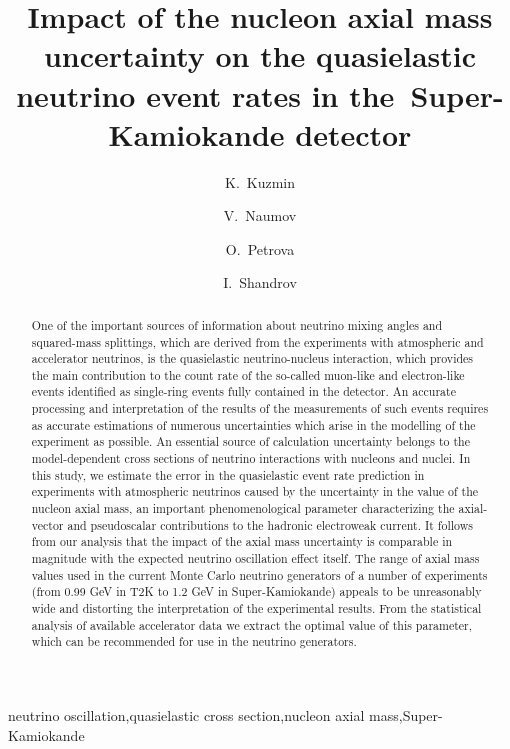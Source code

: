 \documentclass[review]{elsarticle}
\begin{document}
\begin{frontmatter}

\title{Impact of the nucleon axial mass uncertainty on the quasielastic neutrino event rates in the~Super-Kamiokande detector}

\author[ITEP,JINR]{K.~Kuzmin}

\author[JINR]{V.~Naumov}

\author[JINR]{O.~Petrova}

\author[JINR]{I.~Shandrov}

\address[ITEP]{Institute for Theoretical and Experimental Physics, Bolshaya Cheremushkinskaya 25, RU-117218 Moscow, Russia}
\address[JINR]{Joint Institute for Nuclear Research, Joliot-Curie 6, RU-141980 Dubna, Russia}

\begin{abstract}
One of the important sources of information about neutrino mixing angles and squared-mass splittings, which are derived from the experiments with atmospheric and accelerator neutrinos, is the quasielastic neutrino-nucleus interaction, which provides the main contribution to the count rate of the so-called muon-like and electron-like events identified as single-ring events fully contained in the detector. An accurate processing and interpretation of the results of the measurements of such events requires as accurate estimations of numerous uncertainties which arise in the modelling of the experiment as possible. An essential source of calculation uncertainty belongs to the model-dependent cross sections of neutrino interactions with nucleons and nuclei. In this study, we estimate the error in the quasielastic event rate prediction in experiments with atmospheric neutrinos caused by the uncertainty in the value of the nucleon axial mass, an important phenomenological parameter characterizing the axial-vector and pseudoscalar contributions to the hadronic electroweak current. It follows from our analysis that  the impact of the axial mass uncertainty is comparable in magnitude with the expected neutrino oscillation effect itself. The range of axial mass values used in the current Monte Carlo neutrino generators of a number of experiments (from 0.99 GeV in T2K to 1.2 GeV in Super-Kamiokande) appeals to be unreasonably wide and distorting the interpretation of the experimental results. From the statistical analysis of available accelerator data we extract the optimal value of this parameter, which can be recommended for use in the neutrino generators.
\end{abstract}

\begin{keyword}
neutrino oscillation\sep quasielastic cross section\sep nucleon axial mass\sep Super-Kamiokande
\end{keyword}

\end{frontmatter}
\end{document}
